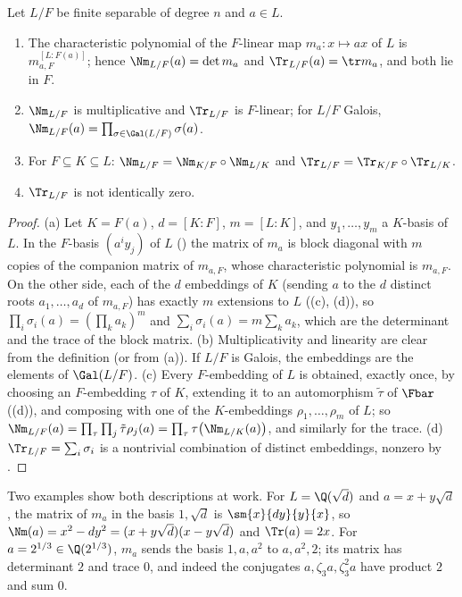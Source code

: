 \begin{proposition}\label{prop:galois:norm-trace}
Let $L/F$ be finite separable of degree $n$ and $a\in L$.
\begin{enumerate}[label=(\alph*)]
\item The characteristic polynomial of the $F$-linear map $m_a\colon x\mapsto ax$ of $L$ is $m_{a,F}^{[L:F(a)]}$; hence $\Nm_{L/F}(a)=\det m_a$ and
$\Tr_{L/F}(a)=\tr m_a$, and both lie in $F$.
\item $\Nm_{L/F}$ is multiplicative and $\Tr_{L/F}$ is $F$-linear; for $L/F$ Galois, $\Nm_{L/F}(a)=\prod_{\sigma\in\Gal(L/F)}\sigma(a)$.
\item For $F\subseteq K\subseteq L$: $\Nm_{L/F}=\Nm_{K/F}\circ\Nm_{L/K}$ and $\Tr_{L/F}=\Tr_{K/F}\circ\Tr_{L/K}$.
\item $\Tr_{L/F}$ is not identically zero.
\end{enumerate}
\end{proposition}

\begin{proof}
(a) Let $K=F(a)$, $d=[K:F]$, $m=[L:K]$, and $y_1,\dots,y_m$ a $K$-basis of $L$. In the $F$-basis $(a^iy_j)$ of $L$ () the matrix of $m_a$ is
block diagonal with $m$ copies of the companion matrix of $m_{a,F}$, whose characteristic polynomial is $m_{a,F}$. On the other side, each of the $d$ embeddings
of $K$ (sending $a$ to the $d$ distinct roots $a_1,\dots,a_d$ of $m_{a,F}$) has exactly $m$ extensions to $L$ ((c), (d)), so
$\prod_i\sigma_i(a)=(\prod_ka_k)^m$ and $\sum_i\sigma_i(a)=m\sum_ka_k$, which are the determinant and the trace of the block matrix.
(b) Multiplicativity and linearity are clear from the definition (or from (a)). If $L/F$ is Galois, the embeddings are the elements of $\Gal(L/F)$.
(c) Every $F$-embedding of $L$ is obtained, exactly once, by choosing an $F$-embedding $\tau$ of $K$, extending it to an automorphism $\tilde\tau$ of $\Fbar$
((d)), and composing with one of the $K$-embeddings $\rho_1,\dots,\rho_m$ of $L$; so $\Nm_{L/F}(a)=\prod_\tau\prod_j\tilde\tau
\rho_j(a)=\prod_\tau\tau\bigl(\Nm_{L/K}(a)\bigr)$, and similarly for the trace.
(d) $\Tr_{L/F}=\sum_i\sigma_i$ is a nontrivial combination of distinct embeddings, nonzero by .
\end{proof}

Two examples show both descriptions at work. For $L=\Q(\sqrt d)$ and $a=x+y\sqrt d$, the matrix of $m_a$ in the basis $1,\sqrt d$ is $\sm{x}{dy}{y}{x}$, so
$\Nm(a)=x^2-dy^2=(x+y\sqrt d)(x-y\sqrt d)$ and $\Tr(a)=2x$. For $a=2^{1/3}\in\Q(2^{1/3})$, $m_a$ sends the basis $1,a,a^2$ to $a,a^2,2$; its matrix has determinant
$2$ and trace $0$, and indeed the conjugates $a,\zeta_3a,\zeta_3^2a$ have product $2$ and sum $0$.

